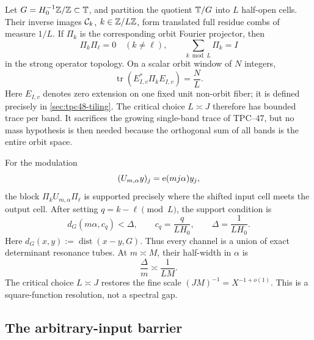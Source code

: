 Let \(G=H_0^{-1}\mathbb Z/\mathbb Z\subset\mathbb T\), and partition the quotient
\(\mathbb T/G\) into \(L\) half-open cells.  Their inverse images
\(\mathcal C_k\), \(k\in\mathbb Z/L\mathbb Z\), form translated full residue combs of
measure \(1/L\).  If \(\Pi_k\) is the corresponding orbit Fourier
projector, then
\begin{equation}
 \Pi_k\Pi_\ell=0\quad(k\ne\ell),
 \qquad
 \sum_{k\bmod L}\Pi_k=I
 \label{eq:tpc48-intro-resolution}
\end{equation}
in the strong operator topology.  On a scalar orbit window of \(N\)
integers,
\begin{equation}
 \operatorname{tr}(E_{I,v}^*\Pi_kE_{I,v})=\frac NL.
 \label{eq:tpc48-intro-band-trace}
\end{equation}
Here \(E_{I,v}\) denotes zero extension on one fixed unit
non-orbit fiber; it is defined precisely in
\cref{sec:tpc48-tiling}.
The critical choice \(L\asymp J\) therefore has bounded trace per
band.  It sacrifices the growing single-band trace of TPC--47, but no
mass hypothesis is then needed because the orthogonal sum of all bands
is the entire orbit space.

For the modulation
\begin{equation}
 (U_{m,\alpha}y)_j=\mathrm e(mj\alpha)y_j,
 \label{eq:tpc48-intro-modulation}
\end{equation}
the block \(\Pi_kU_{m,\alpha}\Pi_\ell\) is supported precisely where
the shifted input cell meets the output cell.  After setting
\(q=k-\ell\pmod L\), the support condition is
\begin{equation}
 d_G(m\alpha,c_q)<\Delta,
 \qquad
 c_q=\frac{q}{LH_0},
 \qquad
 \Delta=\frac1{LH_0}.
 \label{eq:tpc48-intro-tube}
\end{equation}
Here \(d_G(x,y):=\operatorname{dist}(x-y,G)\).
Thus every channel is a union of exact determinant resonance tubes.
At \(m\asymp M\), their half-width in \(\alpha\) is
\begin{equation}
 \frac{\Delta}{m}\asymp\frac1{LM}.
 \label{eq:tpc48-intro-tube-width}
\end{equation}
The critical choice \(L\asymp J\) restores the fine scale
\((JM)^{-1}=X^{-1+o(1)}\).  This is a square-function resolution, not a
spectral gap.

\subsection{The arbitrary-input barrier}

